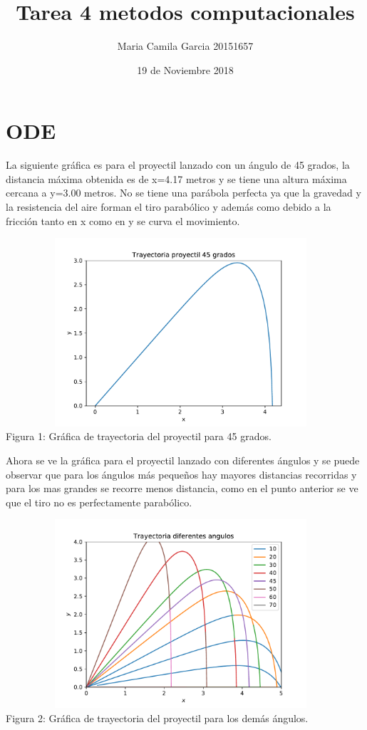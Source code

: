 \documentclass{article}
\title{Tarea 4 metodos computacionales}
\author{Maria Camila Garcia 20151657 }
\date{19 de Noviembre 2018}
\begin{document}
\maketitle
\section{ODE}
La siguiente gráfica es para el proyectil lanzado con un ángulo de 45 grados, la distancia máxima obtenida es de x=4.17 metros y se tiene una altura máxima cercana a y=3.00 metros. No se tiene una parábola perfecta ya que la gravedad y la resistencia del aire forman el tiro parabólico y además como debido a la fricción tanto en x como en y se curva el movimiento.

\begin{center}
\includegraphics[width=13cm, height=7cm]{ODE1.pdf}\\
\small{Figura 1: Gráfica de trayectoria del proyectil para 45 grados.}
\end{center}

Ahora se ve la gráfica para el proyectil lanzado con diferentes ángulos y se puede observar que para los ángulos más pequeños hay mayores distancias recorridas y para los mas grandes se recorre menos distancia, como en el punto anterior se ve que el tiro no es perfectamente parabólico.
\begin{center}
\includegraphics[width=13cm, height=7cm]{ODE2.pdf}\\
\small{Figura 2: Gráfica de trayectoria del proyectil para  los demás ángulos.}
\end{center}
\end{document}
